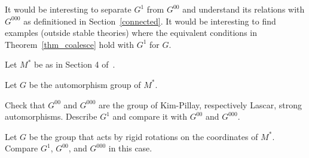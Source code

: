 It would be interesting to separate $G^1$ from $G^{00}$ and understand its relations with $G^{000}$ as definitioned in Section~\ref{connected}.
It would be interesting to find examples (outside stable theories) where the equivalent conditions in Theorem~\ref{thm_coalesce} hold with $G^1$ for $G$.

Let $M^*$ be as in Section 4 of~\cite{CLPZ}. 

\begin{question}
  Let $G$ be the automorphism group of $M^*$.

  Check that $G^{00}$ and $G^{000}$ are the group of Kim-Pillay, respectively Lascar, strong automorphisms.
  Describe $G^1$ and compare it with $G^{00}$ and $G^{000}$.
\end{question}

\begin{question}
  Let $G$ be the group that acts by rigid rotations on the coordinates of $M^*$.
  Compare $G^1$, $G^{00}$, and $G^{000}$ in this case.
\end{question}

